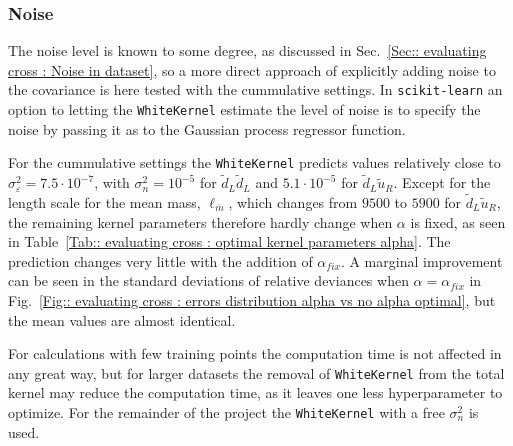 \documentclass[twoside,english]{uiofysmaster}
\begin{document}
{\subsubsection{Noise}

The noise level is known to some degree, as discussed in Sec.~\ref{Sec:: evaluating cross : Noise in dataset}, so a more direct approach of explicitly adding noise to the covariance is here tested with the cummulative settings. In \verb|scikit-learn| an option to letting the \verb|WhiteKernel| estimate the level of noise is to specify the noise by passing it as to the Gaussian process regressor function.



For the cummulative settings the \verb|WhiteKernel| predicts values relatively close to $\sigma_{\varepsilon}^2 = 7.5 \cdot 10^{-7}$, with $\sigma_n^2=10^{-5}$ for $\widetilde{d}_L \widetilde{d}_L$ and $5.1 \cdot 10^{-5}$ for $\widetilde{d}_L \widetilde{u}_R$. Except for the length scale for the mean mass, $\ell_{\bar{m}}$, which changes from $9500$ to $5900$ for $\widetilde{d}_L \widetilde{u}_R$, the remaining kernel parameters therefore hardly change when $\alpha$ is fixed, as seen in Table~\ref{Tab:: evaluating cross : optimal kernel parameters alpha}. The prediction changes very little with the addition of $\alpha_{fix}$. A marginal improvement can be seen in the standard deviations of relative deviances when $\alpha = \alpha_{fix}$ in Fig.~\ref{Fig:: evaluating cross : errors distribution alpha vs no alpha optimal}, but the mean values are almost identical.

For calculations with few training points the computation time is not affected in any great way, but for larger datasets the removal of \verb|WhiteKernel| from the total kernel may reduce the computation time, as it leaves one less hyperparameter to optimize. For the remainder of the project the \verb|WhiteKernel| with a free $\sigma_n^2$ is used.



  

}
\end{document}
